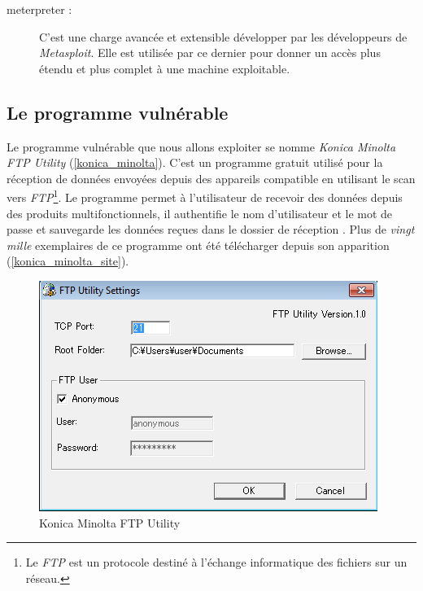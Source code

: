 \begin{description}
        \item[meterpreter :] \label{meterpreter}C'est une charge avancée et extensible développer par les développeurs 
            de \emph{Metasploit}. Elle est utilisée par ce dernier pour donner un accès plus étendu et plus 
            complet à une machine exploitable. 
    \end{description}

    \subsection{Le programme vulnérable}
    Le programme vulnérable que nous allons exploiter se nomme \emph{Konica Minolta FTP Utility} 
    (\autoref{konica_minolta}). 
    C'est un programme gratuit utilisé pour la réception de données envoyées depuis des appareils compatible en 
    utilisant le scan vers \emph{FTP}\footnote{Le \emph{FTP} est un protocole destiné
    à l'échange informatique des fichiers sur un réseau.}. Le programme permet à l'utilisateur de recevoir des données 
    depuis des produits multifonctionnels, il authentifie le nom d'utilisateur et le mot de passe et sauvegarde les
    données reçues dans le dossier de réception \cite{konica_minolta}. Plus de \emph{vingt mille} exemplaires de ce 
    programme ont été télécharger depuis son apparition (\autoref{konica_minolta_site}). %

    \begin{figure}[h]
        \centering
        \includegraphics[width=0.8\linewidth]{images/konica_minolta.png}
        \caption{Konica Minolta FTP Utility}
        \label{konica_minolta}
    \end{figure}
    
